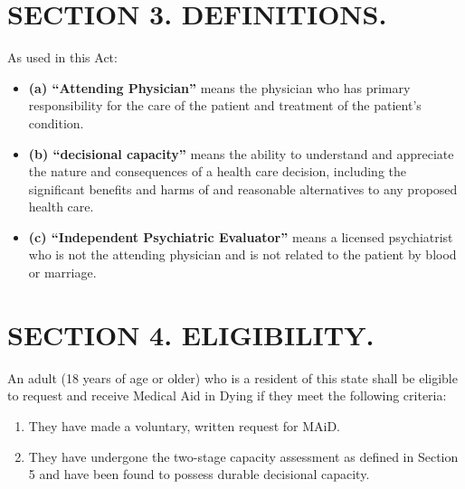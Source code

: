 \documentclass[11pt]{article}
\begin{document}
\section*{SECTION 3. DEFINITIONS.}
As used in this Act:
\begin{itemize}
    \item \textbf{(a) ``Attending Physician''} means the physician who has primary responsibility for the care of the patient and treatment of the patient's condition.
    \item \textbf{(b) ``decisional capacity''} means the ability to understand and appreciate the nature and consequences of a health care decision, including the significant benefits and harms of and reasonable alternatives to any proposed health care.
    \item \textbf{(c) ``Independent Psychiatric Evaluator''} means a licensed psychiatrist who is not the attending physician and is not related to the patient by blood or marriage.
\end{itemize}

\section*{SECTION 4. ELIGIBILITY.}
An adult (18 years of age or older) who is a resident of this state shall be eligible to request and receive Medical Aid in Dying if they meet the following criteria:
\begin{enumerate}
    \item They have made a voluntary, written request for MAiD.
    \item They have undergone the two-stage capacity assessment as defined in Section 5 and have been found to possess durable decisional capacity.
\end{enumerate}
\end{document}
